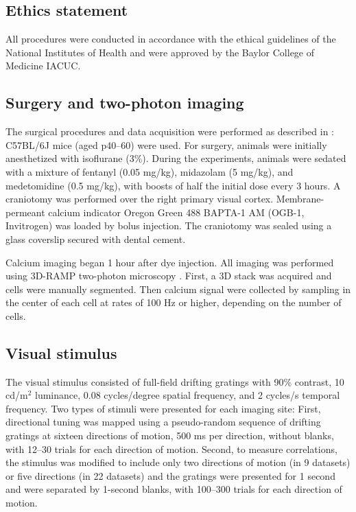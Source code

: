 \subsection*{Ethics statement}
All procedures were conducted in accordance with the ethical guidelines of the National Institutes of Health and were approved by the Baylor College of Medicine IACUC.

\subsection*{Surgery and two-photon imaging}
The surgical procedures and data acquisition were performed as described in \cite{Cotton:2013}: C57BL/6J mice (aged p40--60) were used. For surgery, animals were initially anesthetized with isoflurane (3\%). During the experiments, animals were sedated with a mixture of fentanyl (0.05 mg/kg), midazolam (5 mg/kg), and medetomidine (0.5 mg/kg), with boosts of half the initial dose every 3 hours.  A craniotomy was performed over the right primary visual cortex.  Membrane-permeant calcium indicator Oregon Green 488 BAPTA-1 AM (OGB-1, Invitrogen) was loaded by bolus injection.  The craniotomy was sealed using a glass coverslip secured with dental cement.

Calcium imaging began 1 hour after dye injection.  All imaging was performed using 3D-RAMP two-photon microscopy \cite{Cotton:2013}. First, a 3D stack was acquired and cells were manually segmented. Then calcium signal were collected by sampling in the center of each cell at rates of 100 Hz or higher, depending on the number of cells.

\subsection*{Visual stimulus}
The visual stimulus consisted of full-field drifting gratings with 90\% contrast, 10 cd/m$^2$ luminance, 0.08 cycles/degree spatial frequency, and 2 cycles/s temporal frequency. Two types of stimuli were presented for each imaging site: First, directional tuning was mapped using a pseudo-random sequence of drifting gratings at sixteen directions of motion, 500 ms per direction, without blanks, with 12--30 trials for each direction of motion.  Second, to measure correlations, the stimulus was modified to include only two directions of motion (in 9 datasets) or five directions (in 22 datasets) and the gratings were presented for 1 second and were separated by 1-second blanks, with 100--300 trials for each direction of motion.

